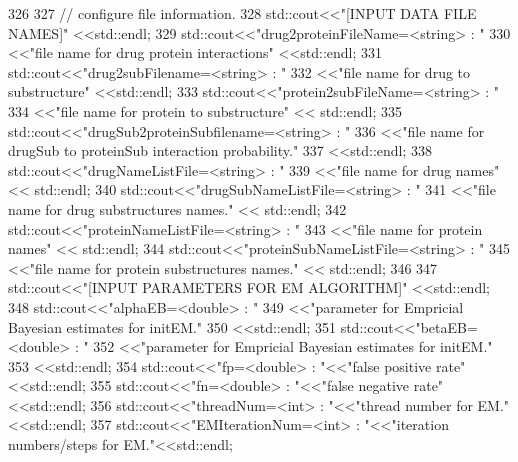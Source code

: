 \begin{DoxyCode}
326 
327     \textcolor{comment}{// configure file information.}
328     std::cout<<\textcolor{stringliteral}{"[INPUT DATA FILE NAMES]"} <<std::endl;
329     std::cout<<\textcolor{stringliteral}{"drug2proteinFileName=<string> : "}
330              <<\textcolor{stringliteral}{"file name for drug protein interactions"} <<std::endl;
331     std::cout<<\textcolor{stringliteral}{"drug2subFilename=<string> : "}
332              <<\textcolor{stringliteral}{"file name for drug to substructure"} <<std::endl;
333     std::cout<<\textcolor{stringliteral}{"protein2subFileName=<string> : "}
334              <<\textcolor{stringliteral}{"file name for protein to substructure"} << std::endl;
335     std::cout<<\textcolor{stringliteral}{"drugSub2proteinSubfilename=<string> : "}
336              <<\textcolor{stringliteral}{"file name for drugSub to proteinSub interaction probability."}
337              <<std::endl;
338     std::cout<<\textcolor{stringliteral}{"drugNameListFile=<string> : "}
339              <<\textcolor{stringliteral}{"file name for drug names"} << std::endl;
340     std::cout<<\textcolor{stringliteral}{"drugSubNameListFile=<string> : "}
341              <<\textcolor{stringliteral}{"file name for drug substructures names."} << std::endl;
342     std::cout<<\textcolor{stringliteral}{"proteinNameListFile=<string> : "}
343              <<\textcolor{stringliteral}{"file name for protein names"} << std::endl;
344     std::cout<<\textcolor{stringliteral}{"proteinSubNameListFile=<string> : "}
345              <<\textcolor{stringliteral}{"file name for protein substructures names."} << std::endl;
346 
347     std::cout<<\textcolor{stringliteral}{"[INPUT PARAMETERS FOR EM ALGORITHM]"} <<std::endl;
348     std::cout<<\textcolor{stringliteral}{"alphaEB=<double> : "}
349              <<\textcolor{stringliteral}{"parameter for Empricial Bayesian estimates for initEM."}
350              <<std::endl;
351     std::cout<<\textcolor{stringliteral}{"betaEB=<double> : "}
352              <<\textcolor{stringliteral}{"parameter for Empricial Bayesian estimates for initEM."}
353              <<std::endl;
354     std::cout<<\textcolor{stringliteral}{"fp=<double> : "}<<\textcolor{stringliteral}{"false positive rate"}<<std::endl;
355     std::cout<<\textcolor{stringliteral}{"fn=<double> : "}<<\textcolor{stringliteral}{"false negative rate"}<<std::endl;
356     std::cout<<\textcolor{stringliteral}{"threadNum=<int> : "}<<\textcolor{stringliteral}{"thread number for EM."} <<std::endl;
357     std::cout<<\textcolor{stringliteral}{"EMIterationNum=<int> : "}<<\textcolor{stringliteral}{"iteration numbers/steps for EM."}<<std::endl;

\end{DoxyCode}
